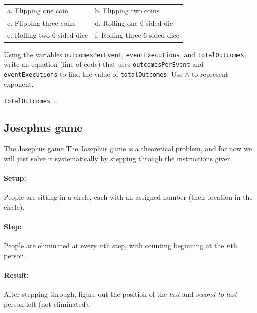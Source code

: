 {\begin{questionNOGRADE}{\thequestion}
        \begin{tabular}{p{6cm} p{6cm}}
            a. Flipping one coin &
            b. Flipping two coins \\
            c. Flipping three coins &
            d. Rolling one 6-sided die \\
            e. Rolling two 6-sided dice &
            f. Rolling three 6-sided dice
        \end{tabular}
    \end{questionNOGRADE}

    \begin{questionNOGRADE}{\thequestion}
        Using the variables \texttt{outcomesPerEvent},
        \texttt{eventExecutions}, and \texttt{totalOutcomes},
        write an equation (line of code) that uses \texttt{outcomesPerEvent}
        and \texttt{eventExecutions} to find the value of \texttt{totalOutcomes}.
        Use $\wedge$
        to represent exponent.

        \texttt{totalOutcomes = }
    \end{questionNOGRADE}

    \newpage

    \subsection{Josephus game}

    \begin{intro}{The Josephus game}
        The Josephus game is a theoretical problem, and for now we
        will just solve it systematically by stepping through the
        instructions given.

        \paragraph{Setup:} People are sitting in a circle, each with
        an assigned number (their location in the circle).

        \paragraph{Step:} People are eliminated at every $n$th step,
        with counting beginning at the $n$th person.

        \paragraph{Result:} After stepping through, figure out the
        position of the \textit{last} and \textit{second-to-last}
        person left (not eliminated).


\end{intro}}
